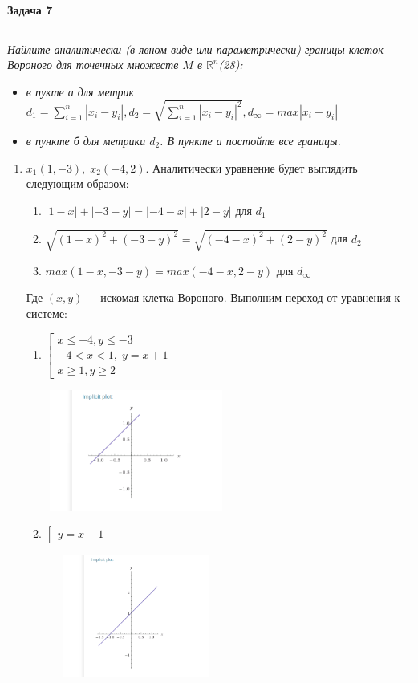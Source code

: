 \documentclass[a4paper,11pt]{article}
\begin{document}
\textbf{\large Задача 7}
\medskip\hrule\medskip
\textit{Найлите аналитически (в явном виде или параметрически) границы клеток Вороного для точечных множеств $ M $ в $ \mathbb{R}^n $(28):}
\begin{itemize}
	\item \textit{в пукте а для метрик $ d_1 = \sum_{i = 1}^{n}|x_i - y_i|, d_2 = \sqrt{\sum_{i = 1}^{n}|x_i - y_i|^2}, d_{\infty} = max|x_i - y_i| $}
	
	\item \textit{в пункте б для метрики $ d_2 $. В пункте а постойте все границы.}
\end{itemize}  
\begin{enumerate}
	\item $ x_1(1, -3), \; x_2(-4, 2) $. Аналитически уравнение будет выглядить следующим образом:
	\begin{enumerate}
		\item $ |1 - x| + |-3 - y| = |-4 - x| + |2 - y| $ для $ d_1 $ 
		\item $ \sqrt{(1 - x)^2 + (-3 - y)^2} = \sqrt{(-4 - x)^2 + (2 - y)^2} $ для $ d_2 $
		\item $ max(1 - x, -3 - y) = max(-4 - x, 2 - y) $ для $ d_{\infty} $
	\end{enumerate}
	Где $ (x, y) - $ искомая клетка Вороного. Выполним переход от уравнения к системе:
	\begin{enumerate}
		\item 
		$\left[\begin{array}{l}
		x \leqslant -4, y \leqslant -3 \\[2pt]
		-4 < x < 1, \; y = x + 1 \\[2pt]
		x \geqslant 1, y \geqslant 2
		\end{array}\right.$
		\begin{center}
			\includegraphics[width = 60mm, height=40mm]{images/1.png}
		\end{center}
		
		\item 
		$\left[\begin{array}{l}
		y = x  +1
		\end{array}\right.$
		\begin{center}
			\includegraphics[width = 60mm, height=40mm]{images/2.png}
		\end{center}
		

\end{enumerate}
\end{enumerate}
\end{document}
